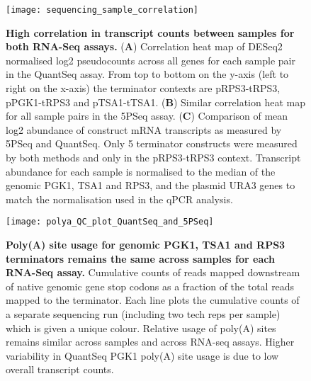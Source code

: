 \documentclass[../main.tex]{subfiles}
\begin{document}
\begin{figure}[ph!]

{\centering \texttt{[image: sequencing\_sample\_correlation]} 

}

\caption[High correlation in transcript counts between samples for both RNA-Seq assays.]{\textbf{High correlation in transcript counts between samples for both RNA-Seq assays.} (\textbf{A}) Correlation heat map of DESeq2 normalised log2 pseudocounts across all genes for each sample pair in the QuantSeq assay. From top to bottom on the y-axis (left to right on the x-axis) the terminator contexts are pRPS3-tRPS3, pPGK1-tRPS3 and pTSA1-tTSA1. (\textbf{B}) Similar correlation heat map for all sample pairs in the 5PSeq assay. (\textbf{C}) Comparison of mean log2 abundance of construct mRNA transcripts as measured by 5PSeq and QuantSeq. Only 5 terminator constructs were measured by both methods and only in the pRPS3-tRPS3 context. Transcript abundance for each sample is normalised to the median of the genomic PGK1, TSA1 and RPS3, and the plasmid URA3 genes to match the normalisation used in the qPCR analysis.}\label{fig:rnaseq-QC-correlation}
\end{figure}

\begin{figure}[ph!]

{\centering \texttt{[image: polya\_QC\_plot\_QuantSeq\_and\_5PSeq]} 

}

\caption[Poly(A) site usage for genomic PGK1, TSA1 and RPS3 terminators remains the same across samples for each RNA-Seq assay.]{\textbf{Poly(A) site usage for genomic PGK1, TSA1 and RPS3 terminators remains the same across samples for each RNA-Seq assay.} Cumulative counts of reads mapped downstream of native genomic gene stop codons as a fraction of the total reads mapped to the terminator. Each line plots the cumulative counts of a separate sequencing run (including two tech reps per sample) which is given a unique colour. Relative usage of poly(A) sites remains similar across samples and across RNA-seq assays. Higher variability in QuantSeq PGK1 poly(A) site usage is due to low overall transcript counts.}\label{fig:rnaseq-QC-QuantSeq-and-5PSeq-genomic-polyA}
\end{figure}
\end{document}
